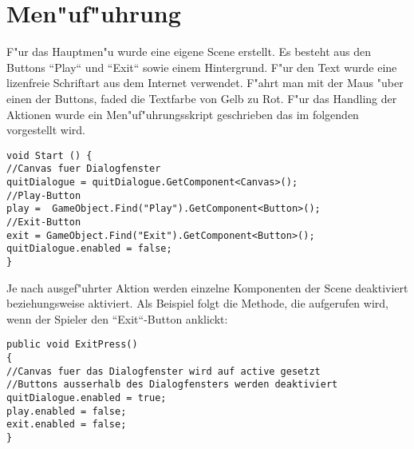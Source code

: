 \chapter{Men"uf"uhrung}
F"ur das Hauptmen"u wurde eine eigene Scene erstellt. Es besteht aus den Buttons ``Play`` und ``Exit`` sowie einem Hintergrund. F"ur den Text wurde eine lizenfreie Schriftart aus dem Internet verwendet. F"ahrt man mit der Maus "uber einen der Buttons, faded die Textfarbe von Gelb zu Rot. \newline
\newline
F"ur das Handling der Aktionen wurde ein Men"uf"uhrungsskript geschrieben das im folgenden vorgestellt wird.

\begin{lstlisting}[breaklines=true]
void Start () {
//Canvas fuer Dialogfenster
quitDialogue = quitDialogue.GetComponent<Canvas>();
//Play-Button
play =  GameObject.Find("Play").GetComponent<Button>();
//Exit-Button
exit = GameObject.Find("Exit").GetComponent<Button>();
quitDialogue.enabled = false;
}
\end{lstlisting}

Je nach ausgef"uhrter Aktion werden einzelne Komponenten der Scene deaktiviert beziehungsweise aktiviert. 
Als Beispiel folgt die Methode, die aufgerufen wird, wenn der Spieler den ``Exit``-Button anklickt:

\begin{lstlisting}[breaklines=true]
public void ExitPress()
{
//Canvas fuer das Dialogfenster wird auf active gesetzt
//Buttons ausserhalb des Dialogfensters werden deaktiviert
quitDialogue.enabled = true;
play.enabled = false;
exit.enabled = false;
}
\end{lstlisting}
